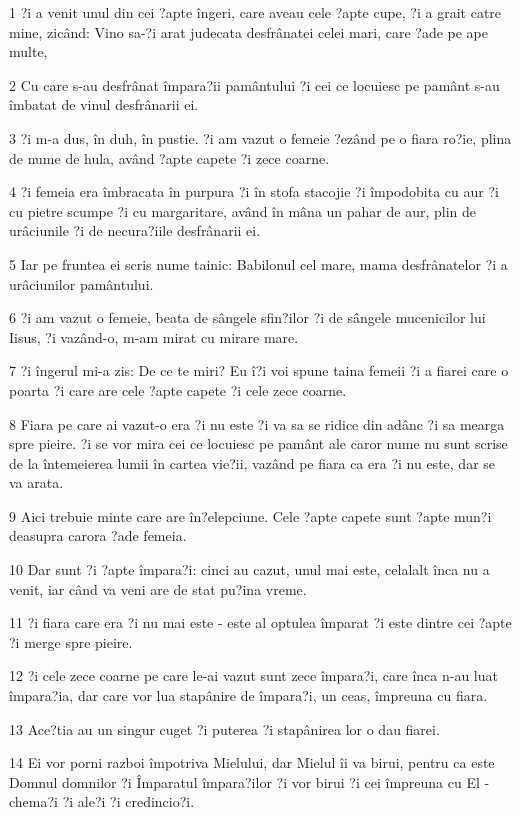 \par 1 ?i a venit unul din cei ?apte îngeri, care aveau cele ?apte cupe, ?i a grait catre mine, zicând: Vino sa-?i arat judecata desfrânatei celei mari, care ?ade pe ape multe,
\par 2 Cu care s-au desfrânat împara?ii pamântului ?i cei ce locuiesc pe pamânt s-au îmbatat de vinul desfrânarii ei.
\par 3 ?i m-a dus, în duh, în pustie. ?i am vazut o femeie ?ezând pe o fiara ro?ie, plina de nume de hula, având ?apte capete ?i zece coarne.
\par 4 ?i femeia era îmbracata în purpura ?i în stofa stacojie ?i împodobita cu aur ?i cu pietre scumpe ?i cu margaritare, având în mâna un pahar de aur, plin de urâciunile ?i de necura?iile desfrânarii ei.
\par 5 Iar pe fruntea ei scris nume tainic: Babilonul cel mare, mama desfrânatelor ?i a urâciunilor pamântului.
\par 6 ?i am vazut o femeie, beata de sângele sfin?ilor ?i de sângele mucenicilor lui Iisus, ?i vazând-o, m-am mirat cu mirare mare.
\par 7 ?i îngerul mi-a zis: De ce te miri? Eu î?i voi spune taina femeii ?i a fiarei care o poarta ?i care are cele ?apte capete ?i cele zece coarne.
\par 8 Fiara pe care ai vazut-o era ?i nu este ?i va sa se ridice din adânc ?i sa mearga spre pieire. ?i se vor mira cei ce locuiesc pe pamânt ale caror nume nu sunt scrise de la întemeierea lumii în cartea vie?ii, vazând pe fiara ca era ?i nu este, dar se va arata.
\par 9 Aici trebuie minte care are în?elepciune. Cele ?apte capete sunt ?apte mun?i deasupra carora ?ade femeia.
\par 10 Dar sunt ?i ?apte împara?i: cinci au cazut, unul mai este, celalalt înca nu a venit, iar când va veni are de stat pu?ina vreme.
\par 11 ?i fiara care era ?i nu mai este - este al optulea împarat ?i este dintre cei ?apte ?i merge spre pieire.
\par 12 ?i cele zece coarne pe care le-ai vazut sunt zece împara?i, care înca n-au luat împara?ia, dar care vor lua stapânire de împara?i, un ceas, împreuna cu fiara.
\par 13 Ace?tia au un singur cuget ?i puterea ?i stapânirea lor o dau fiarei.
\par 14 Ei vor porni razboi împotriva Mielului, dar Mielul îi va birui, pentru ca este Domnul domnilor ?i Împaratul împara?ilor ?i vor birui ?i cei împreuna cu El - chema?i ?i ale?i ?i credincio?i.
